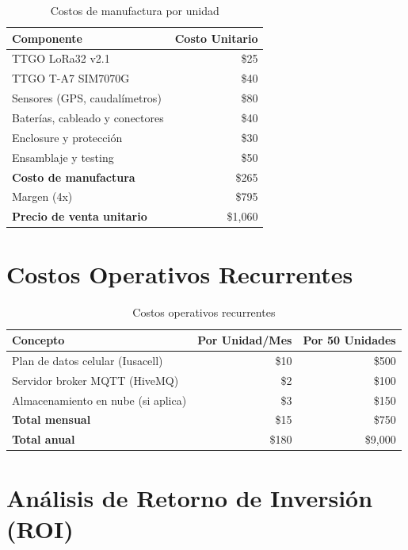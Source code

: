 \documentclass[12pt,a4paper,oneside]{report}
\begin{document}
\begin{table}[H]
    \centering
    \begin{tabular}{|l|r|}
        \hline
        \textbf{Componente} & \textbf{Costo Unitario} \\
        \hline
        TTGO LoRa32 v2.1 & \$25 \\
        TTGO T-A7 SIM7070G & \$40 \\
        Sensores (GPS, caudalímetros) & \$80 \\
        Baterías, cableado y conectores & \$40 \\
        Enclosure y protección & \$30 \\
        Ensamblaje y testing & \$50 \\
        \hline
        \textbf{Costo de manufactura} & \$265 \\
        \hline
        Margen (4x) & \$795 \\
        \hline
        \textbf{Precio de venta unitario} & \$1,060 \\
        \hline
    \end{tabular}
    \caption{Costos de manufactura por unidad}
\end{table}

\section{Costos Operativos Recurrentes}

\begin{table}[H]
    \centering
    \begin{tabular}{|l|r|r|}
        \hline
        \textbf{Concepto} & \textbf{Por Unidad/Mes} & \textbf{Por 50 Unidades} \\
        \hline
        Plan de datos celular (Iusacell) & \$10 & \$500 \\
        Servidor broker MQTT (HiveMQ) & \$2 & \$100 \\
        Almacenamiento en nube (si aplica) & \$3 & \$150 \\
        \hline
        \textbf{Total mensual} & \$15 & \$750 \\
        \textbf{Total anual} & \$180 & \$9,000 \\
        \hline
    \end{tabular}
    \caption{Costos operativos recurrentes}
\end{table}

\section{Análisis de Retorno de Inversión (ROI)}
\end{document}
